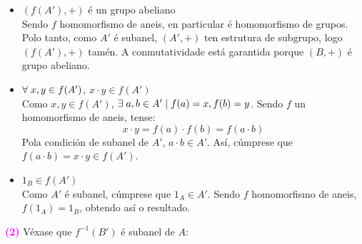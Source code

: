 \documentclass[twoside]{report}
\newcommand{\magbf}[1]{\textcolor{magenta}{\textbf{#1}}} %
\theoremstyle{mystyle}
\begin{document}
\begin{itemize}
    \item $(f(A'), +)$ é un grupo abeliano\\
    
    Sendo $f$ homomorfismo de aneis, en particular é homomorfismo de grupos. Polo tanto, como $A'$ é subanel, $(A', +)$ ten estrutura de subgrupo, logo $(f(A'), +)$ tamén. A conmutatividade está garantida porque $(B,+)$ é grupo abeliano.\\
    
    \item $\forall \hspace{1mm} x, y \in f(A')$, $x \cdot y \in f(A')$\\
    
    Como $x,y \in f(A')$, $\exists \hspace{1mm} a,b \in A' \hspace{1mm} | \hspace{1mm} f(a) = x, f(b) = y$. Sendo $f$ un homomorfismo de aneis, tense:
    $$x \cdot y = f(a) \cdot f(b) = f(a \cdot b)$$
    Pola condición de subanel de $A'$, $a \cdot b \in A'$. Así, cúmprese que $f(a \cdot b) = x \cdot y \in f(A')$.\\
    
    \item $1_{B} \in f(A')$\\
    
    Como $A'$ é subanel, cúmprese que $1_{A} \in A'$. Sendo $f$ homomorfismo de aneis, $f(1_{A}) = 1_{B}$, obtendo así o resultado.\\
\end{itemize}

\noindent \magbf{(2)} Véxase que $f^{-1}(B')$ é subanel de $A$:
\end{document}
